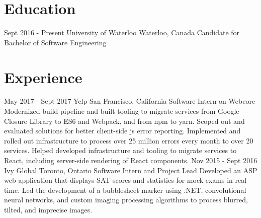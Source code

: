 \documentclass{resume}
\begin{document}
  \begin{main}
    \vspace{0.2cm}%
    \section{Education}
      \begin{entrylist}
        \rightentry%
        {Sept 2016 - Present}%
        {University of Waterloo}%
        {Waterloo, Canada}%
        {Candidate for Bachelor of Software Engineering}%
        {}
      \end{entrylist}
    \section{Experience}
      \begin{entrylist}
        \rightentry%
          {May 2017 - Sept 2017}%
          {Yelp}%
          {San Francisco, California}%
          {Software Intern on Webcore}%
          {%
            Modernized build pipeline and built %
            tooling to migrate services from Google Closure Library to ES6 and %
            Webpack, and from npm to yarn. Scoped out and evaluated solutions %
            for better client-side js error reporting. Implemented and rolled %
            out infrastructure to process over 25 million errors every month %
            to over 20 services. Helped developed infrastructure and tooling %
            to migrate services to React, including server-side rendering of %
            React components.%
          }
        \rightentry%
          {Nov 2015 - Sept 2016}%
          {Ivy Global}%
          {Toronto, Ontario}%
          {Software Intern and Project Lead}%
          {%
            Developed an ASP web application that displays SAT scores and statistics %
            for mock exams in real time. Led the development of a bubblesheet marker %
            using .NET, convolutional neural networks, and custom imaging processing %
            algorithms to process blurred, tilted, and imprecise images.%
          }
      \end{entrylist}

\end{main}
\end{document}
